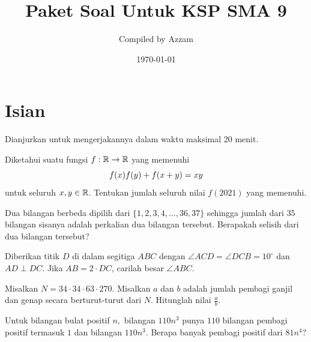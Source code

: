 \documentclass[12pt]{scrartcl}
\begin{document}
	\title{Paket Soal Untuk KSP SMA 9} %
	\date{\today}
	\author{Compiled by Azzam}
	\maketitle

\renewcommand*\contentsname{Daftar Isi}
\tableofcontents

\newpage
	
	\section{Isian}
	Dianjurkan untuk mengerjakannya dalam waktu maksimal 20 menit.
	
	\begin{soalbaru}
		Diketahui suatu fungsi $f:\mathbb R \to \mathbb R$ yang memenuhi 
		\vspace{-10pt}
		$$f(x)f(y)+f(x+y)=xy\\[-12pt]$$
		untuk seluruh $x,y \in \mathbb R$. Tentukan jumlah seluruh nilai $f(2021)$ yang memenuhi.
	\end{soalbaru}
	
	\begin{soalbaru}
	Dua bilangan berbeda dipilih dari $\{1,2,3,4,\dots,36,37\}$ sehingga jumlah dari $35$ bilangan sisanya adalah perkalian dua bilangan tersebut. Berapakah selisih dari dua bilangan tersebut?
	\end{soalbaru}
	
	\begin{soalbaru} 
			
			Diberikan titik $D$ di dalam segitiga $ABC$ dengan $\angle ACD = \angle DCB = 10^\circ$ dan $AD \perp DC$. Jika $AB = 2 \cdot DC$, carilah besar $\angle ABC$.
				\end{soalbaru}
	
		\begin{soalbaru}
		Misalkan $N=34\cdot34\cdot63\cdot270.$ Misalkan $a$ dan $b$ adalah jumlah pembagi ganjil dan genap secara berturut-turut dari $N$. Hitunglah nilai $\frac{a}{b}$.
		\end{soalbaru}
		
		\begin{soalbaru}
		Untuk bilangan bulat positif $n,$ bilangan $110n^3$ punya $110$ bilangan pembagi positif termasuk $1$ dan bilangan $110n^3.$ Berapa banyak pembagi positif dari $81n^4$?
		\end{soalbaru}
		
\end{document}

